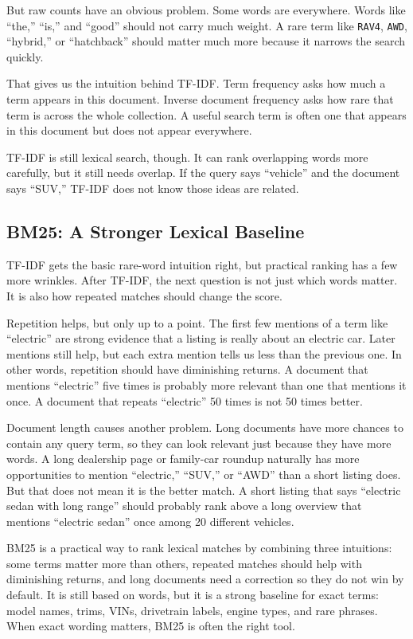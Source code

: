 \documentclass[12pt]{article}
\begin{document}
But raw counts have an obvious problem. Some words are everywhere. Words
like ``the,'' ``is,'' and ``good'' should not carry much weight. A rare
term like \texttt{RAV4}, \texttt{AWD}, ``hybrid,'' or ``hatchback'' should
matter much more because it narrows the search quickly.

That gives us the intuition behind TF-IDF. Term frequency asks how much a
term appears in this document. Inverse document frequency asks how rare
that term is across the whole collection. A useful search term is often
one that appears in this document but does not appear everywhere.

TF-IDF is still lexical search, though. It can rank overlapping words more
carefully, but it still needs overlap. If the query says ``vehicle'' and
the document says ``SUV,'' TF-IDF does not know those ideas are related.

\subsection{BM25: A Stronger Lexical Baseline}

TF-IDF gets the basic rare-word intuition right, but practical ranking has
a few more wrinkles. After TF-IDF, the next question is not just which
words matter. It is also how repeated matches should change the score.

Repetition helps, but only up to a point. The first few mentions of a term
like ``electric'' are strong evidence that a listing is really about an
electric car. Later mentions still help, but each extra mention tells us
less than the previous one. In other words, repetition should have
diminishing returns. A document that mentions ``electric'' five times is
probably more relevant than one that mentions it once. A document that
repeats ``electric'' 50 times is not 50 times better.

Document length causes another problem. Long documents have more chances
to contain any query term, so they can look relevant just because they
have more words. A long dealership page or family-car roundup naturally
has more opportunities to mention ``electric,'' ``SUV,'' or ``AWD'' than a
short listing does. But that does not mean it is the better match. A short
listing that says ``electric sedan with long range'' should probably rank
above a long overview that mentions ``electric sedan'' once among 20
different vehicles.

BM25 is a practical way to rank lexical matches by combining three
intuitions: some terms matter more than others, repeated matches should
help with diminishing returns, and long documents need a correction so
they do not win by default. It is still based on words, but it is a strong
baseline for exact terms: model names, trims, VINs, drivetrain labels,
engine types, and rare phrases. When exact wording matters, BM25 is often
the right tool.
\end{document}

